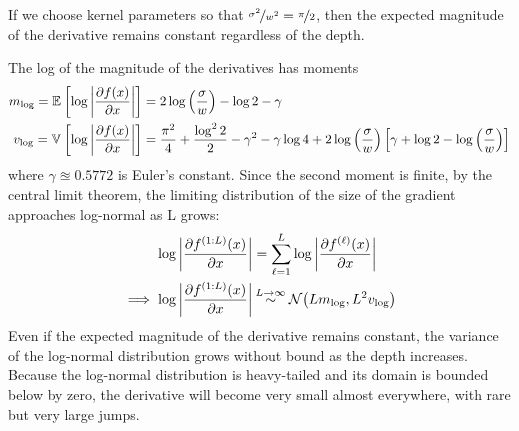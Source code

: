 If we choose kernel parameters so that ${\nicefrac{\sigma^2}{w^2} = \nicefrac{\pi}{2}}$, then the expected magnitude of the derivative remains constant regardless of the depth.


The log of the magnitude of the derivatives has moments
\begin{align}
m_{\log} = \mathbb{E}_{} \left[ {\log \left| \frac{\partial f(x)}{\partial x} \right|} \right] & = 2 \log \left( \frac{\sigma}{w} \right) - \log2 - \gamma \nonumber \\
v_{\log} = \mathbb{V}_{} \left[ {\log \left| \frac{\partial f(x)}{\partial x} \right|} \right] & = \frac{\pi^2}{4} + \frac{\log^2 2}{2}  - \gamma^2 - \gamma \log4 + 2 \log\left(\frac{\sigma}{w}\right) \left[ \gamma + \log2 - \log \left(\frac{\sigma}{w}\right) \right]
\end{align}
where $\gamma \approxeq 0.5772$ is Euler's constant.  Since the second moment is finite, by the central limit theorem, the limiting distribution of the size of the gradient approaches log-normal as L grows:
\begin{align}
\log \left| \frac{\partial f^{(1:L)}(x)}{\partial x} \right| 
& = \sum_{\ell=1}^L \log \left| \frac{\partial f^{(\ell)}(x)}{\partial x} \right| \nonumber \\
 \implies
\log \left| \frac{\partial f^{(1:L)}(x)}{\partial x} \right| & \mathbin{\overset{L \rightarrow \infty}{\sim}} \mathcal{N}\!\left( L m_{\log} ,L^2 v_{\log}\right)
\end{align}
%
Even if the expected magnitude of the derivative remains constant, the variance of the log-normal distribution grows without bound as the depth increases.  Because the log-normal distribution is heavy-tailed and its domain is bounded below by zero, the derivative will become very small almost everywhere, with rare but very large jumps.  


